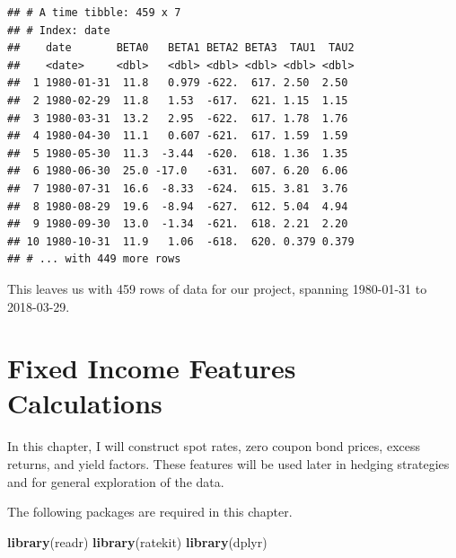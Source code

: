 \documentclass[]{book}
\newenvironment{Shaded}{\begin{snugshade}}{\end{snugshade}}
\newcommand{\DataTypeTok}[1]{\textcolor[rgb]{0.13,0.29,0.53}{#1}}
\newcommand{\KeywordTok}[1]{\textcolor[rgb]{0.13,0.29,0.53}{\textbf{#1}}}
\newcommand{\NormalTok}[1]{#1}
\newcommand{\OperatorTok}[1]{\textcolor[rgb]{0.81,0.36,0.00}{\textbf{#1}}}
\newcommand{\StringTok}[1]{\textcolor[rgb]{0.31,0.60,0.02}{#1}}
\theoremstyle{definition}
\theoremstyle{definition}
\theoremstyle{definition}
\theoremstyle{remark}
\begin{document}
\begin{Shaded}
\end{Shaded}

\begin{verbatim}
## # A time tibble: 459 x 7
## # Index: date
##    date       BETA0   BETA1 BETA2 BETA3  TAU1  TAU2
##    <date>     <dbl>   <dbl> <dbl> <dbl> <dbl> <dbl>
##  1 1980-01-31  11.8   0.979 -622.  617. 2.50  2.50 
##  2 1980-02-29  11.8   1.53  -617.  621. 1.15  1.15 
##  3 1980-03-31  13.2   2.95  -622.  617. 1.78  1.76 
##  4 1980-04-30  11.1   0.607 -621.  617. 1.59  1.59 
##  5 1980-05-30  11.3  -3.44  -620.  618. 1.36  1.35 
##  6 1980-06-30  25.0 -17.0   -631.  607. 6.20  6.06 
##  7 1980-07-31  16.6  -8.33  -624.  615. 3.81  3.76 
##  8 1980-08-29  19.6  -8.94  -627.  612. 5.04  4.94 
##  9 1980-09-30  13.0  -1.34  -621.  618. 2.21  2.20 
## 10 1980-10-31  11.9   1.06  -618.  620. 0.379 0.379
## # ... with 449 more rows
\end{verbatim}

This leaves us with 459 rows of data for our project, spanning
1980-01-31 to 2018-03-29.

\hypertarget{rates}{%
\chapter{Fixed Income Features Calculations}\label{rates}}

In this chapter, I will construct spot rates, zero coupon bond prices,
excess returns, and yield factors. These features will be used later in
hedging strategies and for general exploration of the data.

The following packages are required in this chapter.

\begin{Shaded}
\begin{Highlighting}[]
\KeywordTok{library}\NormalTok{(readr)}
\KeywordTok{library}\NormalTok{(ratekit)}
\KeywordTok{library}\NormalTok{(dplyr)}
\end{Highlighting}
\end{Shaded}
\end{document}
